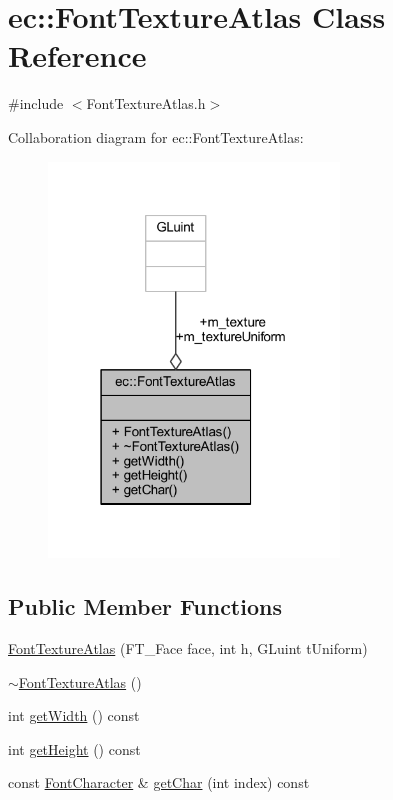 \hypertarget{classec_1_1_font_texture_atlas}{}\section{ec\+:\+:Font\+Texture\+Atlas Class Reference}
\label{classec_1_1_font_texture_atlas}


{\ttfamily \#include $<$Font\+Texture\+Atlas.\+h$>$}



Collaboration diagram for ec\+:\+:Font\+Texture\+Atlas\+:\nopagebreak
\begin{figure}[H]
\begin{center}
\leavevmode
\includegraphics[width=219pt]{classec_1_1_font_texture_atlas__coll__graph}
\end{center}
\end{figure}
\subsection*{Public Member Functions}
\begin{DoxyCompactItemize}
\item 
\mbox{\hyperlink{classec_1_1_font_texture_atlas_abf42f99b2562130eb9b347c895cf14f3}{Font\+Texture\+Atlas}} (F\+T\+\_\+\+Face face, int h, G\+Luint t\+Uniform)
\item 
\mbox{\hyperlink{classec_1_1_font_texture_atlas_a9e520505ca5bd5b9cabe27448d285449}{$\sim$\+Font\+Texture\+Atlas}} ()
\item 
int \mbox{\hyperlink{classec_1_1_font_texture_atlas_a9259106785594dcf52a86120faf2abdf}{get\+Width}} () const
\item 
int \mbox{\hyperlink{classec_1_1_font_texture_atlas_aa6e4a6f124b7fed58783c48c78300244}{get\+Height}} () const
\item 
const \mbox{\hyperlink{structec_1_1_font_character}{Font\+Character}} \& \mbox{\hyperlink{classec_1_1_font_texture_atlas_a4587f2074d6295364a6ab7bac4a5846d}{get\+Char}} (int index) const
\end{DoxyCompactItemize}
